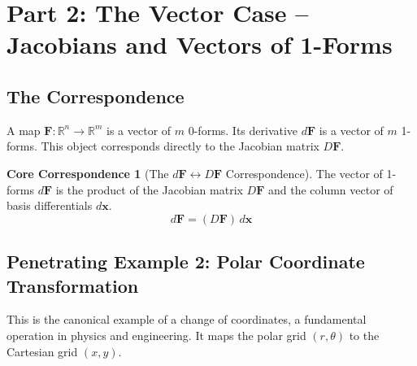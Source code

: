 \documentclass[12pt, letterpaper]{article}
\theoremstyle{definition}
\newtheorem{idea}{Core Correspondence}[section]
\begin{document}
	\section{Part 2: The Vector Case -- Jacobians and Vectors of 1-Forms}
	
	\subsection{The Correspondence}
	A map $\mathbf{F}: \mathbb{R}^n \to \mathbb{R}^m$ is a vector of $m$ 0-forms. Its derivative $d\mathbf{F}$ is a vector of $m$ 1-forms. This object corresponds directly to the Jacobian matrix $D\mathbf{F}$.
	
	\begin{idea}[The $d\mathbf{F} \longleftrightarrow D\mathbf{F}$ Correspondence]
		The vector of 1-forms $d\mathbf{F}$ is the product of the Jacobian matrix $D\mathbf{F}$ and the column vector of basis differentials $d\mathbf{x}$.
		\begin{equation*}
			d\mathbf{F} = (D\mathbf{F}) \, d\mathbf{x}
		\end{equation*}
	\end{idea}
	
	\subsection{Penetrating Example 2: Polar Coordinate Transformation}
	This is the canonical example of a change of coordinates, a fundamental operation in physics and engineering. It maps the polar grid $(r, \theta)$ to the Cartesian grid $(x, y)$.
	
\end{document}
